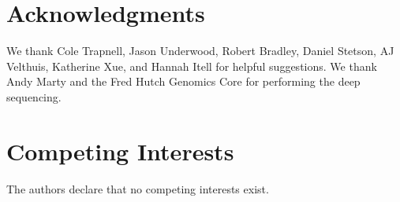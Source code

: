 \documentclass[9pt,lineno]{template}
\begin{document}
\section{Acknowledgments}
We thank Cole Trapnell, Jason Underwood, Robert Bradley, Daniel Stetson, AJ Velthuis, Katherine Xue, and Hannah Itell for helpful suggestions.
We thank Andy Marty and the Fred Hutch Genomics Core for performing the deep sequencing.

\section{Competing Interests}
The authors declare that no competing interests exist.

\nolinenumbers



\clearpage
\end{document}
